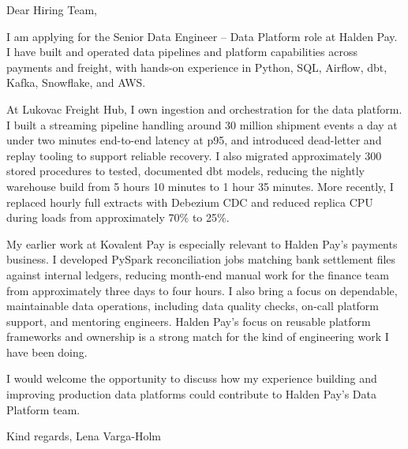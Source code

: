 \documentclass[11pt,a4paper]{article}
\begin{document}
Dear Hiring Team,

I am applying for the Senior Data Engineer – Data Platform role at Halden Pay. I have built and operated data pipelines and platform capabilities across payments and freight, with hands-on experience in Python, SQL, Airflow, dbt, Kafka, Snowflake, and AWS.

At Lukovac Freight Hub, I own ingestion and orchestration for the data platform. I built a streaming pipeline handling around 30 million shipment events a day at under two minutes end-to-end latency at p95, and introduced dead-letter and replay tooling to support reliable recovery. I also migrated approximately 300 stored procedures to tested, documented dbt models, reducing the nightly warehouse build from 5 hours 10 minutes to 1 hour 35 minutes. More recently, I replaced hourly full extracts with Debezium CDC and reduced replica CPU during loads from approximately 70\% to 25\%.

My earlier work at Kovalent Pay is especially relevant to Halden Pay’s payments business. I developed PySpark reconciliation jobs matching bank settlement files against internal ledgers, reducing month-end manual work for the finance team from approximately three days to four hours. I also bring a focus on dependable, maintainable data operations, including data quality checks, on-call platform support, and mentoring engineers. Halden Pay’s focus on reusable platform frameworks and ownership is a strong match for the kind of engineering work I have been doing.

I would welcome the opportunity to discuss how my experience building and improving production data platforms could contribute to Halden Pay’s Data Platform team.

Kind regards,
Lena Varga-Holm
\end{document}
